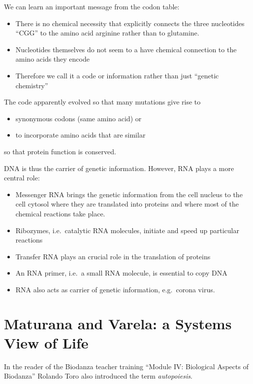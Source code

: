 \documentclass[
  11pt,
]{book}
\providecommand{\tightlist}{%
  \setlength{\itemsep}{0pt}\setlength{\parskip}{0pt}}
\begin{document}
We can learn an important message from the codon table:

\begin{itemize}
\item
  There is no chemical necessity that explicitly connects the three nucleotides ``CGG'' to the amino acid arginine rather than to glutamine.
\item
  Nucleotides themselves do not seem to a have chemical connection to the amino acids they encode
\item
  Therefore we call it a code or information rather than just ``genetic chemistry''
\end{itemize}

The code apparently evolved so that many mutations give rise to

\begin{itemize}
\tightlist
\item
  synonymous codons (same amino acid) or
\item
  to incorporate amino acids that are similar
\end{itemize}

so that protein function is conserved.

DNA is thus the carrier of genetic information. However, RNA plays a more central role:

\begin{itemize}
\tightlist
\item
  Messenger RNA brings the genetic information from the cell nucleus to the cell cytosol where they are translated into proteins and where most of the chemical reactions take place.
\item
  Ribozymes, i.e.~catalytic RNA molecules, initiate and speed up particular reactions
\item
  Transfer RNA plays an crucial role in the translation of proteins
\item
  An RNA primer, i.e.~a small RNA molecule, is essential to copy DNA
\item
  RNA also acts as carrier of genetic information, e.g.~corona virus.
\end{itemize}

\newpage

\hypertarget{maturanaVarela}{%
\section{Maturana and Varela: a Systems View of Life}\label{maturanaVarela}}

In the reader of the Biodanza teacher training ``Module IV: Biological Aspects of Biodanza'' Rolando Toro also introduced the term \emph{autopoiesis}.
\end{document}
